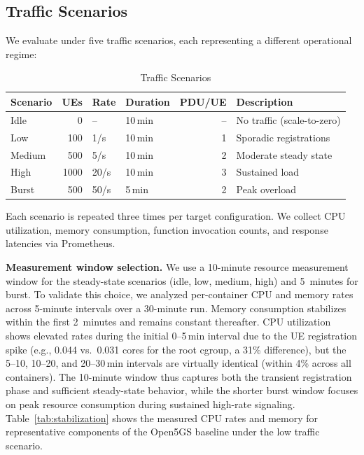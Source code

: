 \documentclass[conference]{IEEEtran}
\begin{document}
\subsection{Traffic Scenarios}

We evaluate under five traffic scenarios, each representing a different operational regime:

\begin{table}[t]
\centering
\caption{Traffic Scenarios}
\label{tab:scenarios}
\small
\begin{tabular}{@{}lrllrl@{}}
\toprule
\textbf{Scenario} & \textbf{UEs} & \textbf{Rate} & \textbf{Duration} & \textbf{PDU/UE} & \textbf{Description} \\
\midrule
Idle   & 0    & --       & 10\,min & -- & No traffic (scale-to-zero) \\
Low    & 100  & 1/s      & 10\,min & 1  & Sporadic registrations \\
Medium & 500  & 5/s      & 10\,min & 2  & Moderate steady state \\
High   & 1000 & 20/s     & 10\,min & 3  & Sustained load \\
Burst  & 500  & 50/s     & 5\,min  & 2  & Peak overload \\
\bottomrule
\end{tabular}
\end{table}

Each scenario is repeated three times per target configuration. We collect CPU utilization, memory consumption, function invocation counts, and response latencies via Prometheus.

\textbf{Measurement window selection.} We use a 10-minute resource measurement window for the steady-state scenarios (idle, low, medium, high) and 5~minutes for burst. To validate this choice, we analyzed per-container CPU and memory rates across 5-minute intervals over a 30-minute run. Memory consumption stabilizes within the first 2~minutes and remains constant thereafter. CPU utilization shows elevated rates during the initial 0--5\,min interval due to the UE registration spike (e.g., 0.044 vs.\ 0.031 cores for the root cgroup, a 31\% difference), but the 5--10, 10--20, and 20--30\,min intervals are virtually identical (within 4\% across all containers). The 10-minute window thus captures both the transient registration phase and sufficient steady-state behavior, while the shorter burst window focuses on peak resource consumption during sustained high-rate signaling. Table~\ref{tab:stabilization} shows the measured CPU rates and memory for representative components of the Open5GS baseline under the low traffic scenario.
\end{document}
